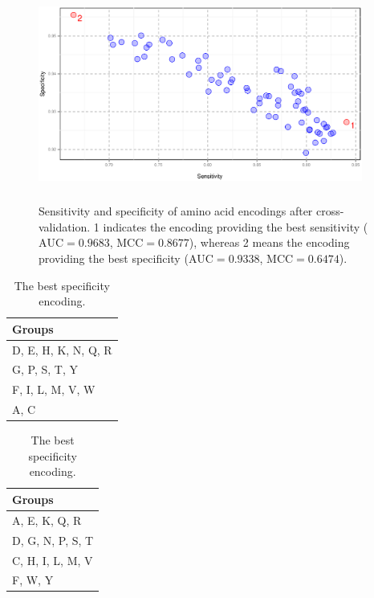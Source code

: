 \documentclass[10pt,letterpaper]{article}
\begin{document}
\begin{figure}[ht]\centering
\includegraphics[width=0.95\textwidth, height=7cm]{figures/cvres.eps}
\caption{Sensitivity and specificity of amino acid encodings after cross-validation. 1 indicates the encoding providing the best sensitivity ($\textrm{AUC} = 0.9683$, $\textrm{MCC} = 0.8677$), whereas 2 means the encoding providing the best specificity ($\textrm{AUC} = 0.9338$, $\textrm{MCC} = 0.6474$).}
\label{fig:cvres}
\end{figure}

\begin{table}[ht]
\begin{minipage}{.5\linewidth} 
\centering
\caption{The best sensitivity (final) encoding.} 
\begin{tabular}{l}
  \toprule
Groups \\ 
  \midrule
D, E, H, K, N, Q, R \\ 
   \rowcolor[gray]{0.85}G, P, S, T, Y \\ 
  F, I, L, M, V, W \\ 
   \rowcolor[gray]{0.85}A, C \\ 
   \bottomrule
\end{tabular}
\label{tab:best}
\end{minipage}
\begin{minipage}{.5\linewidth} 
\centering
\caption{The best specificity encoding.} 
\begin{tabular}{l}
  \toprule
Groups \\ 
  \midrule
A, E, K, Q, R \\ 
   \rowcolor[gray]{0.85}D, G, N, P, S, T \\ 
  C, H, I, L, M, V \\ 
   \rowcolor[gray]{0.85}F, W, Y \\ 
   \bottomrule
\end{tabular}
\label{tab:worst}
\end{minipage}
\end{table}
\end{document}
